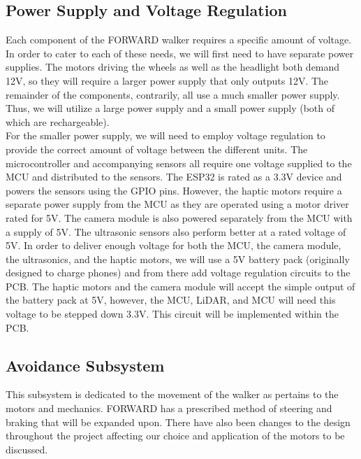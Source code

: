 \subsection{Power Supply and Voltage Regulation}
\noindent Each component of the FORWARD walker requires a specific amount of voltage. In order to cater to each of these needs, we will first need to have separate power supplies. The motors driving the wheels as well as the headlight both demand 12V, so they will require a larger power supply that only outputs 12V. The remainder of the components, contrarily, all use a much smaller power supply. Thus, we will utilize a large power supply and a small power supply (both of which are rechargeable).\\

\noindent For the smaller power supply, we will need to employ voltage regulation to provide the correct amount of voltage between the different units. The microcontroller and accompanying sensors all require one voltage supplied to the MCU and distributed to the sensors. The ESP32 is rated as a 3.3V device\cite{sparkfun12024} and powers the sensors using the GPIO pins. However, the haptic motors require a separate power supply from the MCU as they are operated using a motor driver rated for 5V. The camera module is also powered separately from the MCU with a supply of 5V. The ultrasonic sensors also perform better at a rated voltage of 5V. In order to deliver enough voltage for both the MCU, the camera module, the ultrasonics, and the haptic motors, we will use a 5V battery pack (originally designed to charge phones) and from there add voltage regulation circuits to the PCB. The haptic motors and the camera module will accept the simple output of the battery pack at 5V, however, the MCU, LiDAR, and MCU will need this voltage to be stepped down 3.3V. This circuit will be implemented within the PCB.\\

\subsection{Avoidance Subsystem}

\noindent This subsystem is dedicated to the movement of the walker as pertains to the motors and mechanics. FORWARD has a prescribed method of steering and braking that will be expanded upon. There have also been changes to the design throughout the project affecting our choice and application of the motors to be discussed.\\

